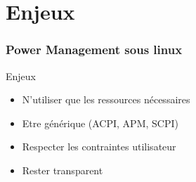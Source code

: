 \section{Enjeux}

\begin{frame}
	\frametitle{Power Management sous linux}
	\begin{block}{Enjeux}
		\begin{itemize}
			\item N'utiliser que les ressources nécessaires
			\item Etre générique (ACPI, APM, SCPI)
			\item Respecter les contraintes utilisateur
			\item Rester transparent
		\end{itemize}
	\end{block}
	\begin{minipage}[t]{0.30\linewidth}
	\end{minipage}
	\begin{minipage}[t]{0.30\linewidth}
	\end{minipage}
	\begin{minipage}[t]{0.30\linewidth}
	\end{minipage}
\end{frame}

